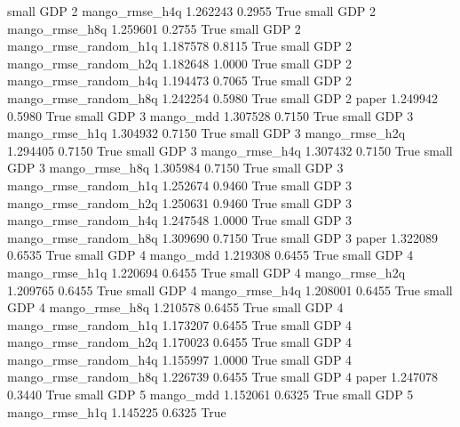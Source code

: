      small      GDP                 2        mango_rmse_h4q   1.262243      0.2955    True
     small      GDP                 2        mango_rmse_h8q   1.259601      0.2755    True
     small      GDP                 2 mango_rmse_random_h1q   1.187578      0.8115    True
     small      GDP                 2 mango_rmse_random_h2q   1.182648      1.0000    True
     small      GDP                 2 mango_rmse_random_h4q   1.194473      0.7065    True
     small      GDP                 2 mango_rmse_random_h8q   1.242254      0.5980    True
     small      GDP                 2                 paper   1.249942      0.5980    True
     small      GDP                 3             mango_mdd   1.307528      0.7150    True
     small      GDP                 3        mango_rmse_h1q   1.304932      0.7150    True
     small      GDP                 3        mango_rmse_h2q   1.294405      0.7150    True
     small      GDP                 3        mango_rmse_h4q   1.307432      0.7150    True
     small      GDP                 3        mango_rmse_h8q   1.305984      0.7150    True
     small      GDP                 3 mango_rmse_random_h1q   1.252674      0.9460    True
     small      GDP                 3 mango_rmse_random_h2q   1.250631      0.9460    True
     small      GDP                 3 mango_rmse_random_h4q   1.247548      1.0000    True
     small      GDP                 3 mango_rmse_random_h8q   1.309690      0.7150    True
     small      GDP                 3                 paper   1.322089      0.6535    True
     small      GDP                 4             mango_mdd   1.219308      0.6455    True
     small      GDP                 4        mango_rmse_h1q   1.220694      0.6455    True
     small      GDP                 4        mango_rmse_h2q   1.209765      0.6455    True
     small      GDP                 4        mango_rmse_h4q   1.208001      0.6455    True
     small      GDP                 4        mango_rmse_h8q   1.210578      0.6455    True
     small      GDP                 4 mango_rmse_random_h1q   1.173207      0.6455    True
     small      GDP                 4 mango_rmse_random_h2q   1.170023      0.6455    True
     small      GDP                 4 mango_rmse_random_h4q   1.155997      1.0000    True
     small      GDP                 4 mango_rmse_random_h8q   1.226739      0.6455    True
     small      GDP                 4                 paper   1.247078      0.3440    True
     small      GDP                 5             mango_mdd   1.152061      0.6325    True
     small      GDP                 5        mango_rmse_h1q   1.145225      0.6325    True
